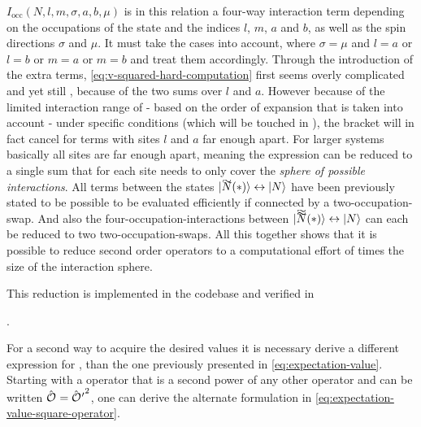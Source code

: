 $I_\text{occ}\left(N,l,m,\sigma,a,b,\mu\right)$ is in this relation a four-way interaction term depending on the occupations of the state \ketN and the indices $l$, $m$, $a$ and $b$, as well as the spin directions $\sigma$ and $\mu$. It must take the cases into account, where $\sigma = \mu$ and $l=a$ or $l=b$ or $m=a$ or $m=b$ and treat them accordingly.
Through the introduction of the extra terms, \autoref{eq:v-squared-hard-computation} first seems overly complicated and yet still , because of the two sums over $l$ and $a$. 
However because of the limited interaction range of \HeffOft[\ast] - based on the order of expansion that is taken into account - under specific conditions (which will be touched in ), the bracket will in fact cancel for terms with sites $l$ and $a$ far enough apart.
For larger systems basically all sites are \glqq far enough\grqq{} apart, meaning the expression can be reduced to a single sum  that for each site needs to only cover the \emph{sphere of possible interactions}.
All terms between the states $\ketN[\vphantom{N}\smash{\tilde{N}}(\ast)] \leftrightarrow \ketN$  have been previously stated to be possible to be evaluated efficiently if connected by a two-occupation-swap.
And also the four-occupation-interactions between $\ketN[\vphantom{N}\smash{\tildetilde{N}}(\ast)] \leftrightarrow \ketN$ can each be reduced to two two-occupation-swaps.
All this together shows that it is possible to reduce second order operators to a computational effort of  times the size of the interaction sphere. 

This reduction is implemented in the codebase and verified in 

.

For a second way to acquire the desired values it is necessary derive a different expression for , than the one previously presented in \autoref{eq:expectation-value}.
Starting with a operator that is a second power of any other operator and can be written $\hat{\text{$\mathcal{O}$}}^{ }_{} = {\hat{\text{$\mathcal{O}$}}^{ }_{}{}'}^2$, one can derive the alternate formulation in \autoref{eq:expectation-value-square-operator}.

